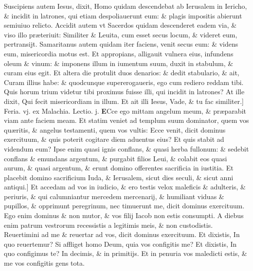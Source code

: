 \documentclass[a5paper,10pt]{book}
\def\leftmarginnote{%
	\lrmarginnote{\hskip -\marginparsep \hskip -6.5em}}
\def\ae{æ}
\begin{document}
\begin{multicols*}{2}
Suscipiens autem Iesus, dixit, Homo quidam descendebat ab Ierusalem in Iericho, \& incidit in latrones, qui
etiam despoliauerunt eum: \& plagis impositis abierunt semiuiuo relicto.
Accidit autem vt Sacerdos quidam descenderet eadem via, \& viso illo pr\ae teriuit: Similiter \& Leuita, cum esset secus locum, \& videret eum, pertransijt.
Samaritanus autem quidam iter faciens, venit secus eum: \& videns eum, misericordia motus est.
Et appropians, alligauit vulnera eius, infundens oleum \& vinum: \& imponens illum in iumentum suum, duxit in stabulum, \& curam eius egit.
Et altera die protulit duos denarios: \& dedit stabulario, \& ait, Curam illius habe: \& quodcunque supererogaueris, ego cum rediero reddam tibi.
Quis horum trium videtur tibi proximus fuisse illi, qui incidit in latrones?
At ille dixit, Qui fecit misericordiam in illum. Et ait illi Iesus, Vade, \& tu fac similiter.]
\newline {} \color{red} \hypertarget{FRI-QVARTA-ADV}{Feria. vj.} ex Malachia. \hfill Lectio. j. \color{black}%
\vspace{-.25em}
\lettrine[lines=2]{\bfseries E}{}\textdagger Cce\leftmarginnote{\begin{flushright}c.3.a\end{flushright}} ego mittam angelum meum, \& pr\ae parabit viam ante faciem meam.
Et statim veniet ad templum suum dominator, quem vos qu\ae ritis, \& angelus testamenti, quem vos vultis: Ecce venit, dicit dominus exercituum, \& quis poterit cogitare diem aduentus eius?
Et quis stabit ad videndum eum? Ipse enim quasi ignis conflans, \& quasi herba fullonum: \& sedebit conflans \& emundans argentum, \& purgabit filios Leui, \& colabit eos quasi aurum, \& quasi argentum, \& erunt domino offerentes sacrificia in iustitia.
Et placebit domino sacrificium Iuda, \& Ierusalem, sicut dies seculi, \& sicut anni antiqui.]
Et accedam ad vos in iudicio, \& ero testis velox maleficis \& adulteris, \& periuris, \& qui calumniantur mercedem mercenarij, \& humiliant viduas \& pupillos, \& opprimunt peregrinum, nec timuerunt me, dicit dominus exercituum.
Ego enim dominus \& non mutor, \& vos filij Iacob non estis consumpti.
A diebus enim patrum vestrorum recessistis a legitimis meis, \& non custodistis. Reuertimini ad me \& reuertar ad vos, dicit dominus exercituum.
Et dixistis, In quo reuertemur? Si affliget homo Deum, quia vos configitis me? Et dixistis, In quo configimus te? In decimis, \& in primitijs.
Et in penuria vos maledicti estis, \& me vos configitis gens tota.

\end{multicols*}
\end{document}
